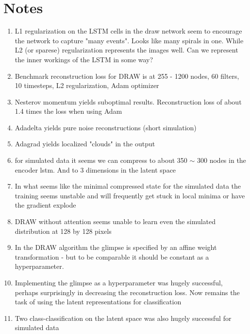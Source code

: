 \chapter{Notes}

\begin{enumerate}
\item L1 regularization on the LSTM cells in the draw network seem to encourage the network to capture "many events". Looks like many spirals in one. While L2 (or sparese) regularization represents the images well. Can we represent the inner workings of the LSTM in some way? 
\item Benchmark reconstruction loss for DRAW is at 255 - 1200 nodes, 60 filters, 10 timesteps, L2 regularization, Adam optimizer
\item Nesterov momentum yields suboptimal results. Reconstruction loss of about 1.4 times the loss when using Adam
\item Adadelta yields pure noise reconstructions (short simulation)
\item Adagrad yields localized "clouds" in the output
\item for simulated data it seems we can compress to about 350 $\sim$ 300 nodes in the encoder lstm. And to 3 dimensions in the latent space
\item In what seems like the minimal compressed state for the simulated data the training seems unstable and will frequently get stuck in local minima or have the gradient explode
\item DRAW without attention seems unable to learn even the simulated distribution at 128 by 128 pixels
\item In the DRAW algorithm the glimpse is specified by an affine weight transformation - but to be comparable it should be constant as a hyperparameter.
\item Implementing the glimpse as a hyperparameter was hugely successful, perhaps surprisingly in decreasing the reconstruction loss. Now remains the task of using the latent representations for classification
\item Two class-classification on the latent space was also hugely successful for simulated data
\end{enumerate}